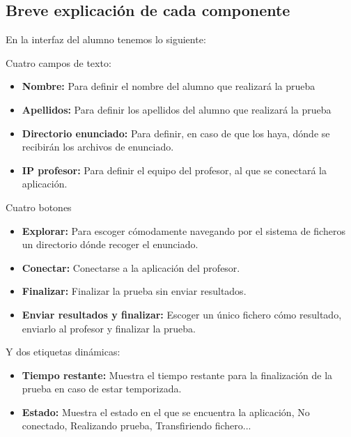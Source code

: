 \documentclass[11pt]{article}
\begin{document}
\subsection{Breve explicación de cada componente}

En la interfaz del alumno tenemos lo siguiente:

Cuatro campos de texto:

\begin{itemize}

    \item {\bfseries Nombre:} Para definir el nombre del alumno que realizará la prueba
    \item {\bfseries Apellidos:} Para definir los apellidos del alumno que realizará la prueba
    \item {\bfseries Directorio enunciado:} Para definir, en caso de que los haya, dónde se recibirán los archivos de enunciado.
    \item {\bfseries IP profesor:} Para definir el equipo del profesor, al que se conectará la aplicación.

\end{itemize}

Cuatro botones

\begin{itemize}

    \item {\bfseries Explorar:} Para escoger cómodamente navegando por el sistema de ficheros un directorio dónde recoger el enunciado.
    \item {\bfseries Conectar:} Conectarse a la aplicación del profesor.
    \item {\bfseries Finalizar:} Finalizar la prueba sin enviar resultados.
    \item {\bfseries Enviar resultados y finalizar:} Escoger un único fichero cómo resultado, enviarlo al profesor y finalizar la prueba.

\end{itemize}

Y dos etiquetas dinámicas:

\begin{itemize}

    \item {\bfseries Tiempo restante:} Muestra el tiempo restante para la finalización de la prueba en caso de estar temporizada.

    \item {\bfseries Estado: } Muestra el estado en el que se encuentra la aplicación, No conectado, Realizando prueba, Transfiriendo fichero...

\end{itemize}
\end{document}
